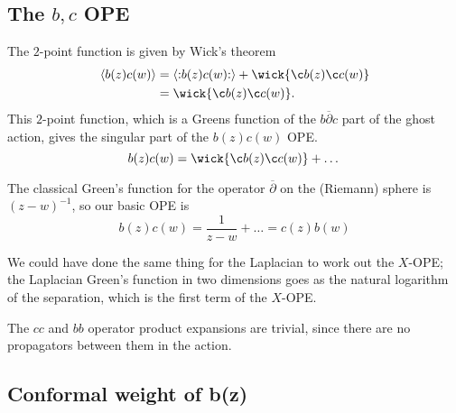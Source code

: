 \subsection{The \texorpdfstring{$b, c$}{b, c} OPE}%
\label{sub:the_b_c_ope}

The $2$-point function is given by Wick's theorem
\begin{align}
  \langle b(z) c(w) \rangle &= \langle \normalorder{b(z) c(w)} \rangle + \wick{\c b (z) \c c(w)} \\
			    &= \wick{\c b(z) \c c(w)}.
\end{align}
This $2$-point function, which is a Greens function of the $b \overline{\partial}{} c$ part of the ghost action, gives the singular part of the $b(z) c(w)$ OPE.
\begin{equation}
  b(z) c(w) = \wick{\c b(z) \c c(w)} + \dots
\end{equation}

The classical Green's function for the operator $\overline{\partial}{}$ on the (Riemann) sphere is $(z - w)^{-1}$, so our basic OPE is
\begin{equation}
  \boxed{b(z) c(w) = \frac{1}{z - w} + \dots = c(z) b(w)}
\end{equation}
\begin{remark}
  We could have done the same thing for the Laplacian to work out the $X$-OPE; the Laplacian Green's function in two dimensions goes as the natural logarithm of the separation, which is the first term of the $X$-OPE.
\end{remark}
\begin{remark}
  The $cc$ and $b b$ operator product expansions are trivial, since there are no propagators between them in the action.
\end{remark}

\subsection{Conformal weight of \texorpdfstring{b(z)}{b}}%
\label{sub:conformal_weight_of_b}

